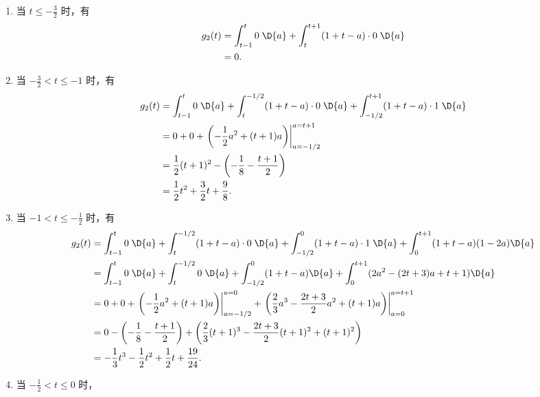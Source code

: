 \begin{solution}
\begin{enumerate}[label=(\arabic*)]
            \begin{enumerate}
                \item 当 $t \le -\frac{3}{2}$ 时，有
                    \begin{align*}
                        g_2(t) & = \int_{t - 1}^{t}0\;\D{a} + \int_{t}^{t + 1}(1 + t - a)\cdot 0\;\D{a} \\
                        & = 0.
                    \end{align*}
                \item 当 $-\frac{3}{2} < t \le -1$ 时，有
                    \begin{align*}
                        g_2(t) & = \int_{t - 1}^{t}0\;\D{a} + \int_{t}^{-1/2}(1 + t - a)\cdot 0\;\D{a} + \int_{-1/2}^{t + 1}(1 + t - a)\cdot 1\;\D{a} \\
                        & = 0 + 0 + \left.\left(-\frac{1}{2}a^2 + (t + 1)a\right)\right|_{a = -1/2}^{a = t + 1} \\
                        & = \frac{1}{2}(t + 1)^2 - \left(-\frac{1}{8} - \frac{t + 1}{2}\right) \\
                        & = \frac{1}{2}t^2 + \frac{3}{2}t + \frac{9}{8}.
                    \end{align*}
                \item 当 $-1 < t \le -\frac{1}{2}$ 时，有
                    \begin{align*}
                        g_2(t) & = \int_{t - 1}^{t}0\;\D{a} + \int_{t}^{-1/2}(1 + t - a)\cdot 0\;\D{a} + \int_{-1/2}^{0}(1 + t - a) \cdot 1\;\D{a} + \int_{0}^{t + 1}(1 + t - a)(1 - 2a)\D{a} \\
                        & = \int_{t - 1}^{t}0\;\D{a} + \int_{t}^{-1/2}0\;\D{a} + \int_{-1/2}^{0}(1 + t - a)\D{a} + \int_{0}^{t + 1}(2a^2 - (2t + 3)a + t + 1)\D{a} \\
                        & = 0 + 0 + \left.\left(-\frac{1}{2}a^2 + (t + 1)a\right)\right|_{a = -1/2}^{a = 0} + \left.\left(\frac{2}{3}a^3 - \frac{2t + 3}{2}a^2 + (t + 1)a\right)\right|_{a = 0}^{a = t + 1} \\
                        & = 0 - \left(-\frac{1}{8} - \frac{t + 1}{2}\right) + \left(\frac{2}{3}(t + 1)^3 - \frac{2t + 3}{2}(t + 1)^2 + (t + 1)^2\right) \\
                        & = -\frac{1}{3}t^3 - \frac{1}{2}t^2 + \frac{1}{2}t + \frac{19}{24}.
                    \end{align*}
                \item 当 $-\frac{1}{2} < t \le 0$ 时，

\end{enumerate}
\end{enumerate}
\end{solution}
